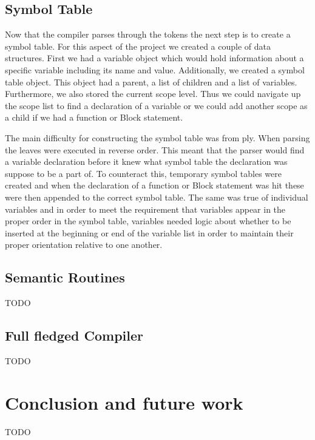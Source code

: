 \documentclass[12pt]{article}
\begin{document}
    	\subsection{Symbol Table}
    		Now that the compiler parses through the tokens the next step is to create a symbol table.  For this aspect of the project we created a couple of data structures.  First we had a variable object which would hold information about a specific variable including its name and value.  Additionally, we created a symbol table object.  This object had a parent, a list of children and a list of variables.  Furthermore, we also stored the current scope level.  Thus we could navigate up the scope list to find a declaration of a variable or we could add another scope as a child if we had a function or Block statement.  
    		
    		The main difficulty for constructing the symbol table was from ply.  When parsing the leaves were executed in reverse order.  This meant that the parser would find a variable declaration before it knew what symbol table the declaration was suppose to be a part of.   To counteract this, temporary symbol tables were created and when the declaration of a function or Block statement was hit these were then appended to the correct symbol table.  The same was true of individual variables and in order to meet the requirement that variables appear in the proper order in the symbol table, variables needed logic about whether to be inserted at the beginning or end of the variable list in order to maintain their proper orientation relative to one another.

    	\subsection{Semantic Routines}
    		TODO

    	\subsection{Full fledged Compiler}
    		TODO

    \section{Conclusion and future work}	
			TODO	    
    
 
\end{document}
